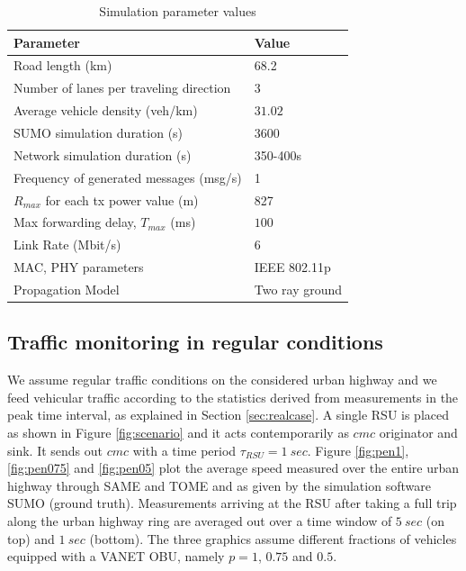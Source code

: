 \documentclass[conference]{IEEEtran}
\begin{document}
\begin{table}[t]
	\caption{Simulation parameter values}
	\label{tab:parameters}
	\centering
\small
	\begin{tabular}{l|l}
		\hline
		\multicolumn{1}{l|}{\textbf{Parameter}} & \multicolumn{1}{l}{\textbf{Value}} \\
		\hline
		Road length (km) & 68.2 \\
		Number of lanes per traveling direction & 3 \\
		Average vehicle density (veh/km) & $31.02$ \\
		SUMO simulation duration (s) & 3600 \\
		Network simulation duration (s) & 350-400s \\
		Frequency of generated messages (msg/s) & 1  \\
		$R_{max}$ for each tx power value (m) & 827 \\
		Max forwarding delay, $T_{max}$ (ms) & $100$\\
		Link Rate (Mbit/s) & $6$\\
		MAC, PHY parameters & IEEE 802.11p \\
		Propagation Model & Two ray ground \\
		\hline
	\end{tabular}
\end{table}



\subsection{Traffic monitoring in regular conditions}
\label{subsec:stationary}
We assume regular traffic conditions on the considered urban highway and we feed vehicular traffic according to the statistics derived from measurements in the peak time interval, as explained in Section \ref{sec:realcase}. A single RSU is placed as shown in Figure \ref{fig:scenario} and it acts contemporarily as $cmc$ originator and sink. It sends out $cmc$ with a time period $\tau_{RSU}=1~sec$.
Figure \ref{fig:pen1}, \ref{fig:pen075} and \ref{fig:pen05} plot the average speed measured over the entire urban highway through SAME and TOME and as given by the simulation software SUMO (ground truth). Measurements arriving at the RSU after taking a full trip along the urban highway ring are averaged out over a time window of $5~sec$ (on top) and $1~sec$ (bottom). The three graphics assume different fractions of vehicles equipped with a VANET OBU, namely $p=1$, $0.75$ and $0.5$.
\end{document}
